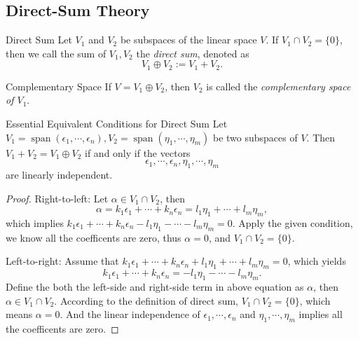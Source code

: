 \subsection{Direct-Sum Theory}

\begin{definition}{Direct Sum}{}
  Let $V_1$ and $V_2$ be subspaces of the linear space $V$.
  If $V_1 \cap V_2 = \{0\}$,
  then we call the sum of $V_1, V_2$ the \emph{direct sum},
  denoted as
  \begin{equation}
    V_1 \oplus V_2 := V_1 + V_2.
  \end{equation}
\end{definition}

\begin{definition}{Complementary Space}{}
  If $V = V_1 \oplus V_2$,
  then $V_2$ is called the \emph{complementary space of $V_1$}.
\end{definition}

\begin{proposition}{Essential Equivalent Conditions for Direct Sum}{}
  Let $V_1 = \operatorname{span}(\epsilon_1,\cdots,\epsilon_n),
  V_2 = \operatorname{span}(\eta_1,\cdots,\eta_m)$ be two subspaces of $V$.
  Then $V_1 + V_2 = V_1 \oplus V_2$ if and only if the vectors
  \begin{equation}
    \epsilon_1,\cdots,\epsilon_n,\eta_1,\cdots,\eta_m
  \end{equation}
  are linearly independent.
\end{proposition}

\begin{proof}
  Right-to-left: Let $\alpha \in V_1 \cap V_2$, then
  \begin{equation}
    \alpha = k_1\epsilon_1 + \cdots + k_n\epsilon_n = l_1\eta_1 + \cdots + l_m\eta_m,
  \end{equation}
  which implies $k_1 \epsilon_1 + \cdots + k_n \epsilon_n - l_1\eta_1 - \cdots -
  l_m \eta_m = 0$.
  Apply the given condition, we know all the coefficents are zero,
  thus $\alpha = 0$, and $V_1 \cap V_2 = \{0\}$.

  Left-to-right:
  Assume that $k_1\epsilon_1 + \cdots + k_n\epsilon_n + l_1\eta_1 + \cdots +
  l_m\eta_m = 0$, which yields
  \begin{equation}
    k_1\epsilon_1 + \cdots + k_n\epsilon_n = -l_1\eta_1 - \cdots - l_m\eta_m.
  \end{equation}
  Define the both the left-side and right-side term in above equation as
  $\alpha$, then $\alpha \in V_1 \cap V_2$.
  According to the definition of direct sum,
  $V_1 \cap V_2 = \{0\}$, which means $\alpha = 0$.
  And the linear independence of $\epsilon_1,\cdots,\epsilon_n$ and
  $\eta_1,\cdots,\eta_m$
  implies all the coefficents are zero.
\end{proof}

